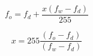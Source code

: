 \documentclass{article}
\begin{document}
\[ f_o = f_d + \frac{x(f_w - f_d)}{255} \]
\pagebreak

\[ x = 255 \frac{(f_o - f_d)}{(f_w - f_d)} \]
\pagebreak
\end{document}
